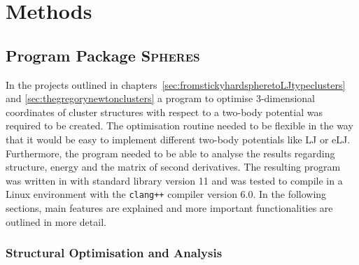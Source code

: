
\acresetall

\part{Methods}
\label{sec:methods}

\chapter{Program Package \textsc{Spheres}}
\label{sec:theprogramspheres}

In the projects outlined in
chapters~\ref{sec:fromstickyhardspheretoLJtypeclusters} and
\ref{sec:thegregorynewtonclusters} a program to optimise 3-dimensional
coordinates of cluster structures with respect to a two-body potential was
required to be created. The optimisation routine needed to be flexible in the
way that it would be easy to implement different two-body potentials like
\acf{LJ} or \acf{eLJ}. Furthermore, the program needed to be able to analyse the
results regarding structure, energy and the matrix of second derivatives. The
resulting program was written in \Cpp with standard library version 11 and was
tested to compile in a Linux environment with the \texttt{clang++} compiler
version 6.0. In the following sections, main features are explained and more
important functionalities are outlined in more detail.


\section{Structural Optimisation and Analysis}
\label{sec:generalstructure}

